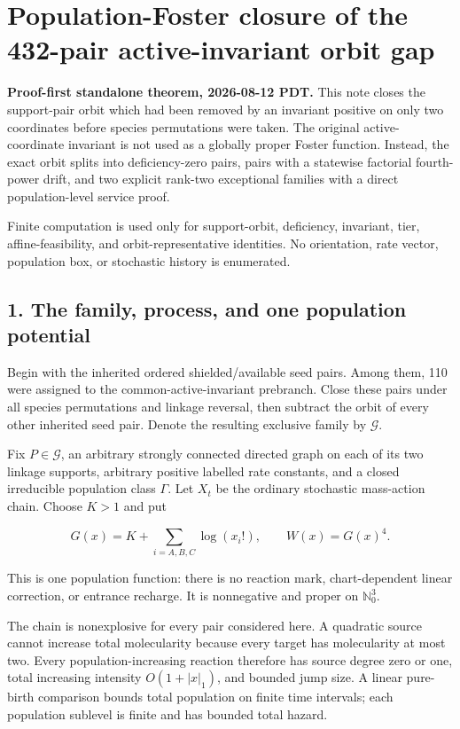 \section{Population-Foster closure of the 432-pair active-invariant
orbit
gap}

\textbf{Proof-first standalone theorem, 2026-08-12 PDT.} This note
closes the support-pair orbit which had been removed by an invariant
positive on only two coordinates before species permutations were taken.
The original active-coordinate invariant is not used as a globally
proper Foster function. Instead, the exact orbit splits into
deficiency-zero pairs, pairs with a statewise factorial fourth-power
drift, and two explicit rank-two exceptional families with a direct
population-level service proof.

Finite computation is used only for support-orbit, deficiency,
invariant, tier, affine-feasibility, and orbit-representative
identities. No orientation, rate vector, population box, or stochastic
history is enumerated.

\subsection{1. The family, process, and one population
potential}

Begin with the inherited ordered shielded/available seed pairs. Among
them, 110 were assigned to the common-active-invariant prebranch. Close
these pairs under all species permutations and linkage reversal, then
subtract the orbit of every other inherited seed pair. Denote the
resulting exclusive family by \(\mathcal G\).

Fix \(P\in\mathcal G\), an arbitrary strongly connected directed graph
on each of its two linkage supports, arbitrary positive labelled rate
constants, and a closed irreducible population class \(\Gamma\). Let
\(X_t\) be the ordinary stochastic mass-action chain. Choose \(K>1\) and
put

\[
 G(x)=K+\sum_{i=A,B,C}\log(x_i!),
 \qquad W(x)=G(x)^4.                                  \tag{1.1}
\]

This is one population function: there is no reaction mark,
chart-dependent linear correction, or entrance recharge. It is
nonnegative and proper on \(\mathbb N_0^3\).

The chain is nonexplosive for every pair considered here. A quadratic
source cannot increase total molecularity because every target has
molecularity at most two. Every population-increasing reaction therefore
has source degree zero or one, total increasing intensity
\(O(1+|x|_1)\), and bounded jump size. A linear pure-birth comparison
bounds total population on finite time intervals; each population
sublevel is finite and has bounded total hazard.

